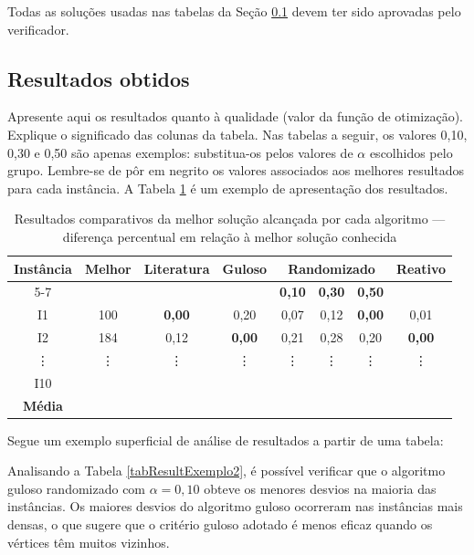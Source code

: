 \documentclass[12pt]{article}
\begin{document}
Todas as soluções usadas nas tabelas da Seção \ref{subSecResultados} devem ter sido aprovadas pelo verificador.


\subsection{Resultados obtidos}
\label{subSecResultados}

Apresente aqui os resultados quanto à qualidade (valor da função de otimização). Explique o significado das colunas da tabela. Nas tabelas a seguir, os valores 0,10, 0,30 e 0,50 são apenas exemplos: substitua-os pelos valores de $\alpha$ escolhidos pelo grupo. Lembre-se de pôr em negrito os valores associados aos melhores resultados para cada instância. A Tabela \ref{tabResultExemplo} é um exemplo de apresentação dos resultados.

\begin{table}[htbp]
\centering
\caption{Resultados comparativos da melhor solução alcançada por cada algoritmo — diferença percentual em relação à melhor solução conhecida}
\renewcommand{\arraystretch}{1.2}
{
\footnotesize
\begin{tabular}{|c|c|c|c|c|c|c|c|}
\hline
\textbf{Instância} & \textbf{Melhor} & \textbf{Literatura} & \textbf{Guloso} & \multicolumn{3}{c|}{\textbf{Randomizado}} & \textbf{Reativo} \\ \cline{5-7}
 & & & &  \multicolumn{1}{c|}{{\bf 0,10}} & \multicolumn{1}{c|}{{\bf 0,30}} & \multicolumn{1}{c|}{{\bf 0,50}} & \\
\hline
I1 & 100 & \textbf{0,00} & 0,20 & 0,07 &  0,12 & \textbf{0,00} & 0,01 \\
I2 & 184 & 0,12 & \textbf{0,00} & 0,21 & 0,28 & 0,20 & \textbf{0,00} \\
\vdots & \vdots & \vdots & \vdots  & \vdots & \vdots & \vdots & \vdots \\
I10 &  &  &  &  &  &  &  \\
\hline
\textbf{Média} &  &  &  &  &  &  &  \\
\hline
\end{tabular}
}
\label{tabResultExemplo}
\end{table}

Segue um exemplo superficial de análise de resultados a partir de uma tabela:

Analisando a Tabela \ref{tabResultExemplo2}, é possível verificar que o algoritmo guloso randomizado com $\alpha = 0{,}10$ obteve os menores desvios na maioria das instâncias. Os maiores desvios do algoritmo guloso ocorreram nas instâncias mais densas, o que sugere que o critério guloso adotado é menos eficaz quando os vértices têm muitos vizinhos.
\end{document}
